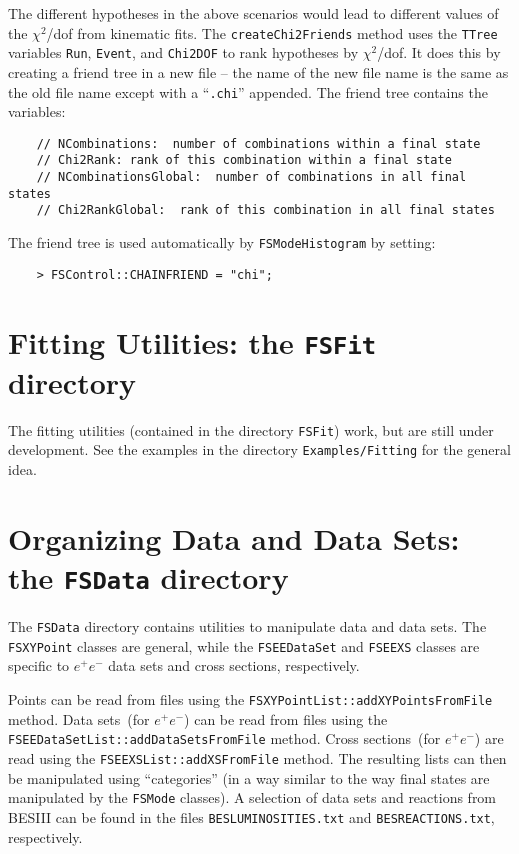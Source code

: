 \documentclass[11pt]{article}
\begin{document}
The different hypotheses in the above scenarios would lead to different values of the $\chi^2$/dof from kinematic fits.  The {\tt createChi2Friends} method uses the {\tt TTree} variables {\tt Run}, {\tt Event}, and {\tt Chi2DOF} to rank hypotheses by $\chi^2$/dof.  It does this by creating a friend tree in a new file -- the name of the new file name is the same as the old file name except with a ``{\tt .chi}'' appended.  The friend tree contains the variables:
\begin{verbatim}
    // NCombinations:  number of combinations within a final state
    // Chi2Rank: rank of this combination within a final state
    // NCombinationsGlobal:  number of combinations in all final states
    // Chi2RankGlobal:  rank of this combination in all final states
\end{verbatim}
The friend tree is used automatically by {\tt FSModeHistogram} by setting:
\begin{verbatim}
    > FSControl::CHAINFRIEND = "chi";
\end{verbatim}


\newpage

\section{Fitting Utilities:  the {\tt FSFit} directory}

The fitting utilities (contained in the directory {\tt FSFit}) work, but are still under development.  See the examples in the directory {\tt Examples/Fitting} for the general idea.

\section{Organizing Data and Data Sets: the {\tt FSData} directory}

The {\tt FSData} directory contains utilities to manipulate data and data sets.  The {\tt FSXYPoint} classes are general, while the {\tt FSEEDataSet} and {\tt FSEEXS} classes are specific to $e^+e^-$ data sets and cross sections, respectively.

Points can be read from files using the {\tt FSXYPointList::addXYPointsFromFile} method.
Data sets~(for $e^+e^-$) can be read from files using the {\tt FSEEDataSetList::addDataSetsFromFile} method.  Cross sections~(for $e^+e^-$) are read using the {\tt FSEEXSList::addXSFromFile} method.  The resulting lists can then be manipulated using ``categories'' (in a way similar to the way final states are manipulated by the {\tt FSMode} classes).  A selection of data sets and reactions from BESIII can be found in the files {\tt BESLUMINOSITIES.txt} and {\tt BESREACTIONS.txt}, respectively.
\end{document}
